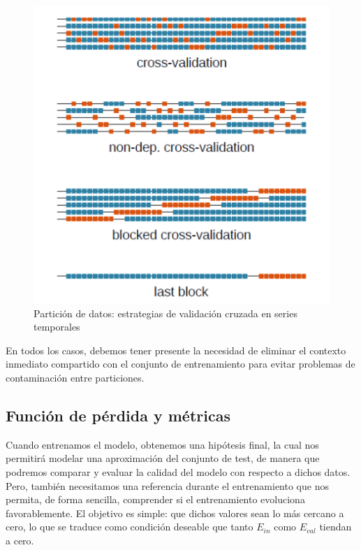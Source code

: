 \begin{figure}[!ht]
	\centering
	\includegraphics[scale=0.35]{img/valid}
	\caption{Partición de datos: estrategias de validación cruzada en series temporales \cite{bergmeir2012use}}
	\label{valid}
\end{figure}

En todos los casos, debemos tener presente la necesidad de eliminar el contexto inmediato compartido con el conjunto de entrenamiento para evitar problemas de contaminación entre particiones.

\subsection{Función de pérdida y métricas}
\label{metricassd}
Cuando entrenamos el modelo, obtenemos una hipótesis final, la cual nos permitirá modelar una aproximación del conjunto de test, de manera que podremos comparar y evaluar la calidad del modelo con respecto a dichos datos. Pero, también necesitamos una referencia durante el entrenamiento que nos permita, de forma sencilla, comprender si el entrenamiento evoluciona favorablemente. El objetivo es simple: que dichos valores sean lo más cercano a cero, lo que se traduce como condición deseable que tanto $E_{in}$ como $E_{val}$ tiendan a cero.\\

